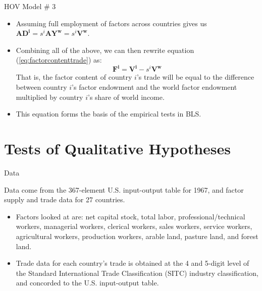 \documentclass[aspectratio=169]{beamer}
\begin{document}

\begin{frame}{HOV Model \# 3}

\begin{itemize}
    \item<1-> Assuming full employment of factors across countries gives us $ \mathbf{AD^{i}} = s^{i} \mathbf{AY^{w}}= s^{i} \mathbf{V^{w}} $.
    \item<2-> Combining all of the above, we can then rewrite equation (\ref{eq:factorcontenttrade}) as:
    \begin{equation}
        \mathbf{F^{i}} = \mathbf{V^{i}} - s^{i} \mathbf{V^{w}}
        \label{eq:HOVequation}
    \end{equation}
    That is, the factor content of country $ i $’s trade will be equal to the difference between country $ i $’s factor endowment and the world factor endowment multiplied by country $ i $’s share of world income.
    \item<3-> This equation forms the basis of the empirical tests in BLS.
\end{itemize}
    
\end{frame}


\section{Tests of Qualitative Hypotheses}


\begin{frame}{Data}

Data come from the 367-element U.S. input-output table for 1967, and factor supply and trade data for 27 countries.

\begin{itemize}
    \item<1-> Factors looked at are: net capital stock, total labor, professional/technical workers, managerial workers, clerical workers, sales workers, service workers, agricultural workers, production workers, arable land, pasture land, and forest land.
    \item<2-> Trade data for each country’s trade is obtained at the 4 and 5-digit level of the Standard International Trade Classification (SITC) industry classification, and concorded to the U.S. input-output table.
\end{itemize}
    
\end{frame}
\end{document}

